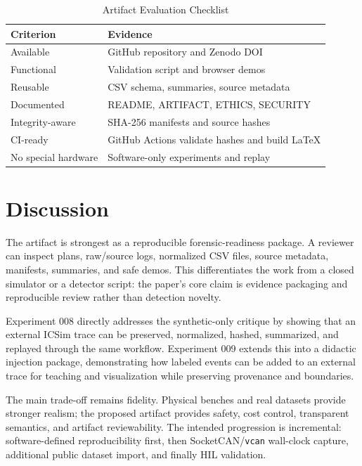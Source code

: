 \documentclass[conference]{IEEEtran}
\begin{document}
\begin{table}[t]
\caption{Artifact Evaluation Checklist}
\label{tab:artifactcheck}
\centering
\footnotesize
\begin{tabular}{p{}p{}}
\toprule
Criterion & Evidence \\
\midrule
Available & GitHub repository and Zenodo DOI \\
Functional & Validation script and browser demos \\
Reusable & CSV schema, summaries, source metadata \\
Documented & README, ARTIFACT, ETHICS, SECURITY \\
Integrity-aware & SHA-256 manifests and source hashes \\
CI-ready & GitHub Actions validate hashes and build LaTeX \\
No special hardware & Software-only experiments and replay \\
\bottomrule
\end{tabular}
\end{table}

\section{Discussion}
The artifact is strongest as a reproducible forensic-readiness package. A reviewer can inspect plans, raw/source logs, normalized CSV files, source metadata, manifests, summaries, and safe demos. This differentiates the work from a closed simulator or a detector script: the paper's core claim is evidence packaging and reproducible review rather than detection novelty.

Experiment 008 directly addresses the synthetic-only critique by showing that an external ICSim trace can be preserved, normalized, hashed, summarized, and replayed through the same workflow. Experiment 009 extends this into a didactic injection package, demonstrating how labeled events can be added to an external trace for teaching and visualization while preserving provenance and boundaries.

The main trade-off remains fidelity. Physical benches and real datasets provide stronger realism; the proposed artifact provides safety, cost control, transparent semantics, and artifact reviewability. The intended progression is incremental: software-defined reproducibility first, then SocketCAN/\texttt{vcan} wall-clock capture, additional public dataset import, and finally HIL validation.
\end{document}
